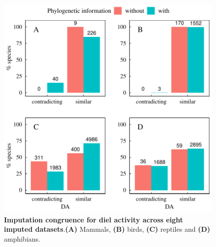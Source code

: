 \documentclass[11pt]{article}
\begin{document}
\begin{figure}[h!]
\centering
\includegraphics[scale=0.6]{figures/Congruence_categorical_traits/DA}
\caption[Imputation congruence for diel activity across eight imputed datasets]{\textbf{Imputation congruence for diel activity across eight imputed datasets}.\textbf{(A)} Mammals, \textbf{(B)} birds, \textbf{(C)} reptiles and \textbf{(D)} amphibians.}
\label{congruenceDA}
\end{figure}
\end{document}
